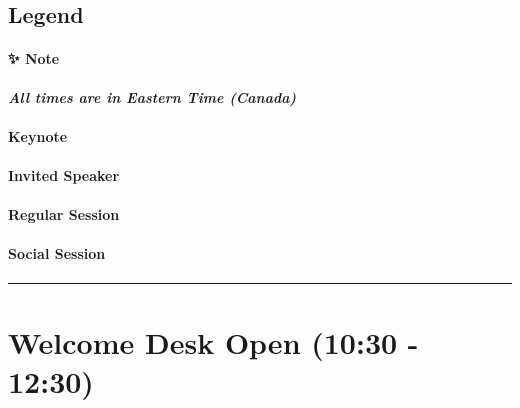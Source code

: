 \documentclass[
]{book}
\begin{document}
\hypertarget{legend}{%
\subsection*{Legend}\label{legend}}

\begin{protip}
\hypertarget{note}{%
\paragraph*{✨ Note}\label{note}}

\textbf{\emph{All times are in Eastern Time (Canada)}}
\end{protip}

\begin{keynote}
\hypertarget{keynote}{%
\paragraph{Keynote}\label{keynote}}
\end{keynote}

\begin{speaker}
\hypertarget{invited-speaker}{%
\paragraph{Invited Speaker}\label{invited-speaker}}
\end{speaker}

\begin{session}
\hypertarget{regular-session}{%
\paragraph{Regular Session}\label{regular-session}}
\end{session}
\begin{social}
\hypertarget{social-session}{%
\paragraph{Social Session}\label{social-session}}
\end{social}

\begin{center}\rule{0.5\linewidth}{0.5pt}\end{center}

\hypertarget{welcome-desk-open-1030---1230}{%
\section*{Welcome Desk Open (10:30 - 12:30)}\label{welcome-desk-open-1030---1230}}
\end{document}
